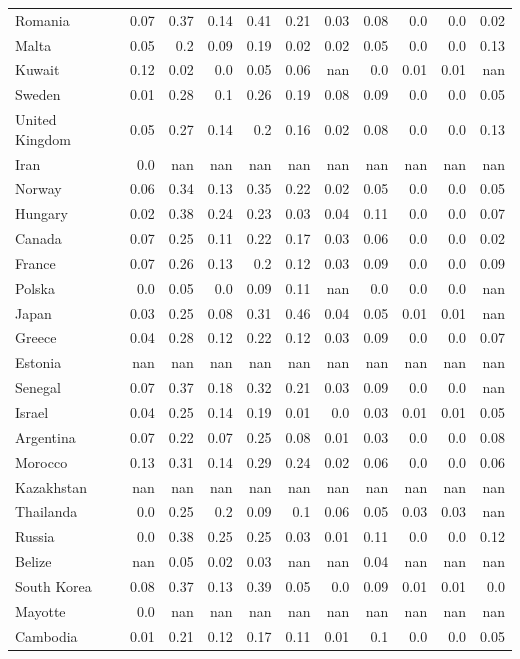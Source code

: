 \documentclass[11pt]{article}
\begin{document}
\begin{center}
\begin{longtable}{|p{70pt}|r|r|r|r|r|r|r|r|r|r|}
Romania& 0.07& 0.37& 0.14& 0.41& 0.21& 0.03& 0.08& 0.0& 0.0& 0.02\\
Malta& 0.05& 0.2& 0.09& 0.19& 0.02& 0.02& 0.05& 0.0& 0.0& 0.13\\
Kuwait& 0.12& 0.02& 0.0& 0.05& 0.06& nan& 0.0& 0.01& 0.01& nan\\
Sweden& 0.01& 0.28& 0.1& 0.26& 0.19& 0.08& 0.09& 0.0& 0.0& 0.05\\
United Kingdom& 0.05& 0.27& 0.14& 0.2& 0.16& 0.02& 0.08& 0.0& 0.0& 0.13\\
Iran& 0.0& nan& nan& nan& nan& nan& nan& nan& nan& nan\\
Norway& 0.06& 0.34& 0.13& 0.35& 0.22& 0.02& 0.05& 0.0& 0.0& 0.05\\
Hungary& 0.02& 0.38& 0.24& 0.23& 0.03& 0.04& 0.11& 0.0& 0.0& 0.07\\
Canada& 0.07& 0.25& 0.11& 0.22& 0.17& 0.03& 0.06& 0.0& 0.0& 0.02\\
France& 0.07& 0.26& 0.13& 0.2& 0.12& 0.03& 0.09& 0.0& 0.0& 0.09\\
Polska& 0.0& 0.05& 0.0& 0.09& 0.11& nan& 0.0& 0.0& 0.0& nan\\
Japan& 0.03& 0.25& 0.08& 0.31& 0.46& 0.04& 0.05& 0.01& 0.01& nan\\
Greece& 0.04& 0.28& 0.12& 0.22& 0.12& 0.03& 0.09& 0.0& 0.0& 0.07\\
Estonia& nan& nan& nan& nan& nan& nan& nan& nan& nan& nan\\
Senegal& 0.07& 0.37& 0.18& 0.32& 0.21& 0.03& 0.09& 0.0& 0.0& nan\\
Israel& 0.04& 0.25& 0.14& 0.19& 0.01& 0.0& 0.03& 0.01& 0.01& 0.05\\
Argentina& 0.07& 0.22& 0.07& 0.25& 0.08& 0.01& 0.03& 0.0& 0.0& 0.08\\
Morocco& 0.13& 0.31& 0.14& 0.29& 0.24& 0.02& 0.06& 0.0& 0.0& 0.06\\
Kazakhstan& nan& nan& nan& nan& nan& nan& nan& nan& nan& nan\\
Thailanda& 0.0& 0.25& 0.2& 0.09& 0.1& 0.06& 0.05& 0.03& 0.03& nan\\
Russia& 0.0& 0.38& 0.25& 0.25& 0.03& 0.01& 0.11& 0.0& 0.0& 0.12\\
Belize& nan& 0.05& 0.02& 0.03& nan& nan& 0.04& nan& nan& nan\\
South Korea& 0.08& 0.37& 0.13& 0.39& 0.05& 0.0& 0.09& 0.01& 0.01& 0.0\\
Mayotte& 0.0& nan& nan& nan& nan& nan& nan& nan& nan& nan\\
Cambodia& 0.01& 0.21& 0.12& 0.17& 0.11& 0.01& 0.1& 0.0& 0.0& 0.05\\

\end{longtable}
\end{center}
\end{document}

